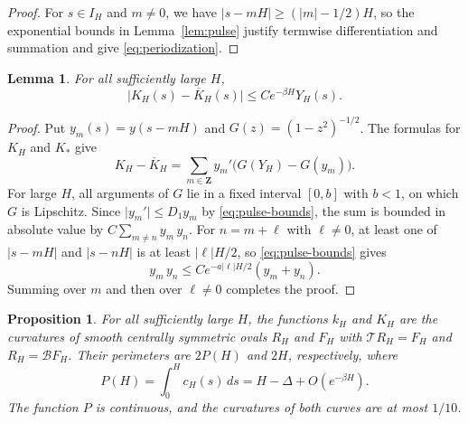 \documentclass[11pt]{article}
\numberwithin{equation}{section}
\newtheorem{proposition}[theorem]{Proposition}
\newtheorem{lemma}[theorem]{Lemma}
\newcommand{\Z}{\mathbf{Z}}
\newcommand{\Tmap}{\mathcal T}
\newcommand{\Bmap}{\mathcal B}
\newcommand{\abs}[1]{\lvert #1\rvert}
\begin{document}
\begin{proof}
For \(s\in I_H\) and \(m\ne0\), we have \(\abs{s-mH}\geq(\abs m-1/2)H\), so
the exponential bounds in Lemma~\ref{lem:pulse} justify termwise
differentiation and summation and give \eqref{eq:periodization}.
\end{proof}

\begin{lemma}\label{lem:front-error}
For all sufficiently large \(H\),
\[
  \abs{K_H(s)-\overline K_H(s)}\leq Ce^{-\beta H}Y_H(s).
\]
\end{lemma}

\begin{proof}
Put \(y_m(s)=y(s-mH)\) and \(G(z)=(1-z^2)^{-1/2}\). The formulas for \(K_H\)
and \(K_*\) give
\[
  K_H-\overline K_H
  =\sum_{m\in\Z} y_m'\bigl(G(Y_H)-G(y_m)\bigr).
\]
For large \(H\), all arguments of \(G\) lie in a fixed interval
\([0,b]\) with \(b<1\), on which \(G\) is Lipschitz. Since
\(\abs{y_m'}\leq D_1 y_m\) by \eqref{eq:pulse-bounds}, the sum is bounded in
absolute value by \(C\sum_{m\ne n}y_m\,y_n\). For \(n=m+\ell\) with
\(\ell\ne0\), at least one of \(\abs{s-mH}\) and \(\abs{s-nH}\) is at least
\(\abs\ell H/2\), so \eqref{eq:pulse-bounds} gives
\[
  y_m\,y_n\leq Ce^{-a\abs\ell H/2}(y_m+y_n).
\]
Summing over \(m\) and then over \(\ell\ne0\) completes the proof.
\end{proof}

\begin{proposition}\label{prop:pairs}
For all sufficiently large \(H\), the functions \(k_H\) and \(K_H\) are the
curvatures of smooth centrally symmetric ovals \(R_H\) and \(F_H\) with
\(\Tmap R_H=F_H\) and \(R_H=\Bmap F_H\). Their perimeters are \(2P(H)\)
and \(2H\), respectively, where
\[
  P(H)=\int_0^H c_H(s)\,ds=H-\Delta+O(e^{-\beta H}).
\]
The function \(P\) is continuous, and the curvatures of both curves are at
most \(1/10\).
\end{proposition}
\end{document}

